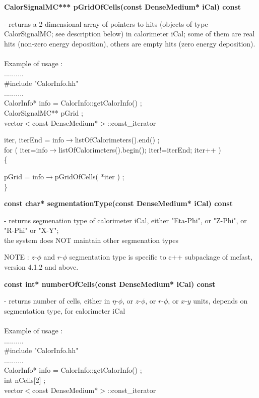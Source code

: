 \begin{center}   
   {\bf CalorSignalMC*** pGridOfCells(const DenseMedium* iCal) const }
\end{center}
   - returns a 2-dimensional array of pointers to hits (objects of type CalorSignalMC; see 
   description below) in calorimeter iCal; some of them are real hits 
   (non-zero energy deposition), others are empty hits (zero energy deposition).\\
   \\
   Example of usage :\\
   .......... \\
   \#include "CalorInfo.hh" \\
   .......... \\
   CalorInfo* info = CalorInfo::getCalorInfo() ; \\
   CalorSignalMC** pGrid ;\\
   vector$<$const DenseMedium*$>$::const\_iterator

      iter, iterEnd = info$\rightarrow$listOfCalorimeters().end() ;\\
   for ( iter=info$\rightarrow$listOfCalorimeters().begin(); iter!=iterEnd; iter++ )\\
   \{ 

      pGrid = info$\rightarrow$pGridOfCells( *iter ) ;\\
   \} \\
   
\begin{center}
   {\bf const char* segmentationType(const DenseMedium* iCal) const }
\end{center}
   - returns segmenation type of calorimeter iCal, either "Eta-Phi", or "Z-Phi", or "R-Phi" or "X-Y"; \\
   the system does NOT maintain other segmenation types
   
   NOTE : $z$-$\phi$ and $r$-$\phi$ segmentation type is specific to c++ subpackage of mcfast, version 4.1.2 and above.


\begin{center}
   {\bf const int* numberOfCells(const DenseMedium* iCal) const }  
\end{center}
   - returns number of cells, either in $\eta$-$\phi$, or $z$-$\phi$, or $r$-$\phi$, or $x$-$y$ units, depends 
   on segmentation type, for calorimeter iCal \\
   \\
   Example of usage : \\
   .......... \\
   \#include "CalorInfo.hh" \\
   .......... \\
   CalorInfo* info = CalorInfo::getCalorInfo() ;\\
   int nCells[2] ;\\
   vector$<$const DenseMedium*$>$::const\_iterator
 
